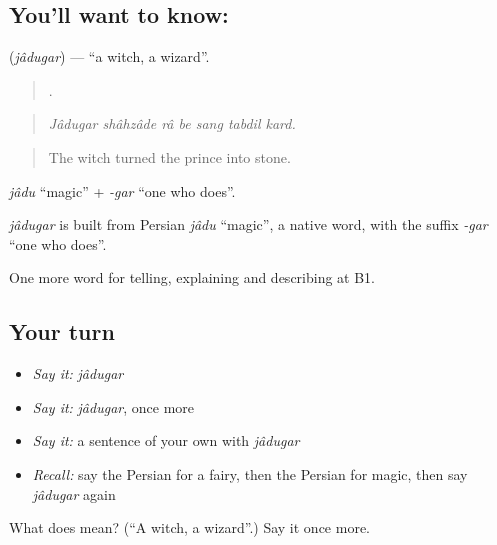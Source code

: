 \subsection*{You'll want to know: }
\textbf{} (\emph{jâdugar}) — \textquotedblleft{}a witch, a wizard\textquotedblright{}.

\begin{quote}
      .
\end{quote}

\begin{quote}
\emph{Jâdugar shâhzâde râ be sang tabdil kard.}
\end{quote}

\begin{quote}
The witch turned the prince into stone.
\end{quote}

\emph{jâdu} \textquotedblleft{}magic\textquotedblright{} + \emph{-gar} \textquotedblleft{}one who does\textquotedblright{}.

\begin{cousinweb}
\emph{jâdugar} is built from Persian \emph{jâdu} \textquotedblleft{}magic\textquotedblright{}, a native word, with the suffix \emph{-gar} \textquotedblleft{}one who does\textquotedblright{}.
\end{cousinweb}

\begin{grammarlens}[title={What you've built}]
One more word for telling, explaining and describing at B1.
\end{grammarlens}

\subsection*{Your turn}
\begin{itemize}
\raggedright
  \item \emph{Say it:} \emph{jâdugar}
  \item \emph{Say it:} \emph{jâdugar}, once more
  \item \emph{Say it:} a sentence of your own with \emph{jâdugar}
  \item \emph{Recall:} say the Persian for a fairy, then the Persian for magic, then say \emph{jâdugar} again
\end{itemize}

\begin{tcolorbox}[breakable,colback=teal!4,colframe=teal!35!black,title={Before you move on}]
What does  mean? (\textquotedblleft{}A witch, a wizard\textquotedblright{}.) Say it once more.
\end{tcolorbox}

